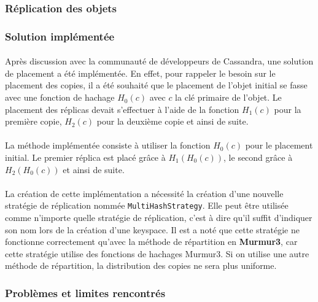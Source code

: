 \documentclass[12pt]{article}
\newcommand{\class}[1]{\texttt{#1}}
\begin{document}
\subsubsection{Réplication des objets}

\subsubsection*{Solution implémentée}

\paragraph{}Après discussion avec la communauté de développeurs de Cassandra, une solution de placement a été implémentée. En effet, pour rappeler le besoin sur le placement des copies, il a été souhaité que le placement de l'objet initial se fasse avec une fonction de hachage $ H_0 (c) $ avec $c$ la clé primaire de l'objet. Le placement des réplicas devait s'effectuer à l'aide de la fonction $ H_1 (c) $ pour la première copie, $H_2 (c) $ pour la deuxième copie et ainsi de suite.

\paragraph{}La méthode implémentée consiste à utiliser la fonction $ H_0 (c) $ pour le placement initial. Le premier réplica est placé grâce à $ H_1 (H_0 (c)) $, le second grâce à $ H_2 (H_0 (c)) $ et ainsi de suite.

\paragraph{}La création de cette implémentation a nécessité la création d'une nouvelle stratégie de réplication nommée \class{MultiHashStrategy}. Elle peut être utilisée comme n'importe quelle stratégie de réplication, c'est à dire qu'il suffit d'indiquer son nom lors de la création d'une keyspace. Il est a noté que cette stratégie ne fonctionne correctement qu'avec la méthode de répartition en \textbf{Murmur3}, car cette stratégie utilise des fonctions de hachages Murmur3. Si on utilise une autre méthode de répartition, la distribution des copies ne sera plus uniforme.

\subsubsection*{Problèmes et limites rencontrés}
\end{document}
